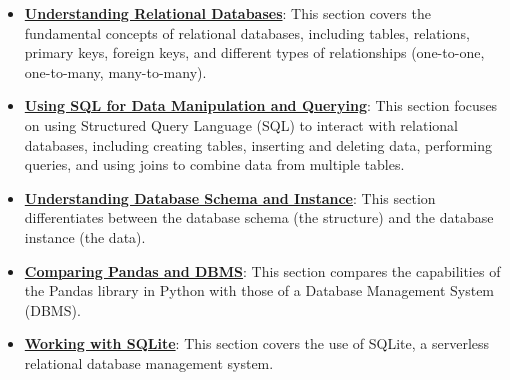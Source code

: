 \documentclass{article}%
\begin{document}
\begin{itemize}[leftmargin=*]%
\item \href{https://purdue.brightspace.com/d2l/common/assets/pdfjs-d2l-dist/1.0.14-legacy/web/viewer.html?file=\%2Fcontent\%2Fenforced\%2F1095465-WL.202510.CS24200.LE1\%2F23L2-relationaldb-sql.pdf\%3Fou\%3D1095465\&lang=en-us\&container=d2l-fileviewer-rendered-pdf\&fullscreen=d2l-fileviewer-rendered-pdf-dialog\&height=667#page=2}{\textbf{Understanding Relational Databases}}: This section covers the fundamental concepts of relational databases, including tables, relations, primary keys, foreign keys, and different types of relationships (one-to-one, one-to-many, many-to-many).%
\item \href{https://purdue.brightspace.com/d2l/common/assets/pdfjs-d2l-dist/1.0.14-legacy/web/viewer.html?file=\%2Fcontent\%2Fenforced\%2F1095465-WL.202510.CS24200.LE1\%2F23L2-relationaldb-sql.pdf\%3Fou\%3D1095465\&lang=en-us\&container=d2l-fileviewer-rendered-pdf\&fullscreen=d2l-fileviewer-rendered-pdf-dialog\&height=667#page=15}{\textbf{Using SQL for Data Manipulation and Querying}}: This section focuses on using Structured Query Language (SQL) to interact with relational databases, including creating tables, inserting and deleting data, performing queries, and using joins to combine data from multiple tables.%
\item \href{https://purdue.brightspace.com/d2l/common/assets/pdfjs-d2l-dist/1.0.14-legacy/web/viewer.html?file=\%2Fcontent\%2Fenforced\%2F1095465-WL.202510.CS24200.LE1\%2F23L2-relationaldb-sql.pdf\%3Fou\%3D1095465\&lang=en-us\&container=d2l-fileviewer-rendered-pdf\&fullscreen=d2l-fileviewer-rendered-pdf-dialog\&height=667#page=14}{\textbf{Understanding Database Schema and Instance}}: This section differentiates between the database schema (the structure) and the database instance (the data).%
\item \href{https://purdue.brightspace.com/d2l/common/assets/pdfjs-d2l-dist/1.0.14-legacy/web/viewer.html?file=\%2Fcontent\%2Fenforced\%2F1095465-WL.202510.CS24200.LE1\%2F23L2-relationaldb-sql.pdf\%3Fou\%3D1095465\&lang=en-us\&container=d2l-fileviewer-rendered-pdf\&fullscreen=d2l-fileviewer-rendered-pdf-dialog\&height=667#page=17}{\textbf{Comparing Pandas and DBMS}}: This section compares the capabilities of the Pandas library in Python with those of a Database Management System (DBMS).%
\item \href{https://purdue.brightspace.com/d2l/common/assets/pdfjs-d2l-dist/1.0.14-legacy/web/viewer.html?file=\%2Fcontent\%2Fenforced\%2F1095465-WL.202510.CS24200.LE1\%2F23L2-relationaldb-sql.pdf\%3Fou\%3D1095465\&lang=en-us\&container=d2l-fileviewer-rendered-pdf\&fullscreen=d2l-fileviewer-rendered-pdf-dialog\&height=667#page=19}{\textbf{Working with SQLite}}: This section covers the use of SQLite, a serverless relational database management system.%

\end{itemize}
\end{document}
